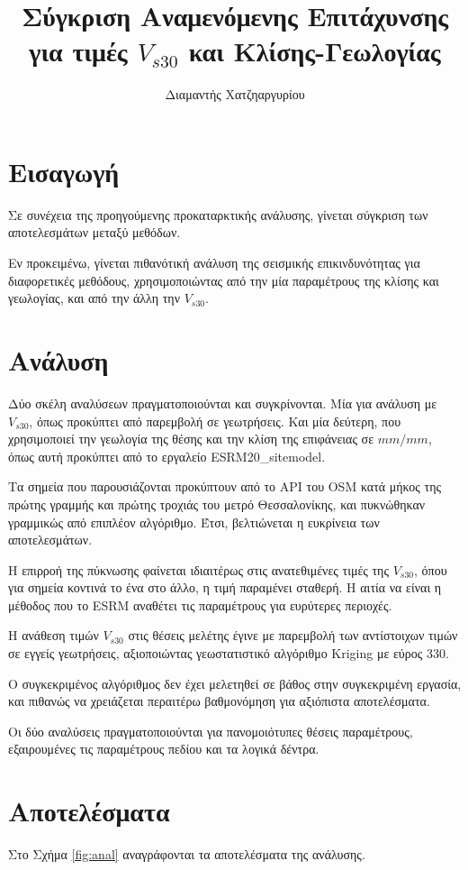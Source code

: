 \documentclass{report}
\title{Σύγκριση Αναμενόμενης Επιτάχυνσης για τιμές $V_{s30}$ και Κλίσης-Γεωλογίας\\
}
\author{Διαμαντής Χατζηαργυρίου}
\date{\Today}
\begin{document}
\maketitle

\section{Εισαγωγή}
Σε συνέχεια της προηγούμενης προκαταρκτικής ανάλυσης, γίνεται σύγκριση των αποτελεσμάτων μεταξύ μεθόδων.

Εν προκειμένω, γίνεται πιθανότική ανάλυση της σεισμικής επικινδυνότητας για διαφορετικές μεθόδους, χρησιμοποιώντας από την μία παραμέτρους της κλίσης και γεωλογίας, και από την άλλη την $V_{s30}$.

\section{Ανάλυση}
Δύο σκέλη αναλύσεων πραγματοποιούνται και συγκρίνονται. Μία για ανάλυση με $V_{s30}$, όπως προκύπτει από παρεμβολή σε γεωτρήσεις. Και μία δεύτερη, που χρησιμοποιεί την γεωλογία της θέσης και την κλίση της επιφάνειας σε $mm/mm$, όπως αυτή προκύπτει από το εργαλείο ESRM20\_sitemodel.

Τα σημεία που παρουσιάζονται προκύπτουν από το API του OSM κατά μήκος της πρώτης γραμμής και πρώτης τροχιάς του μετρό Θεσσαλονίκης, και πυκνώθηκαν γραμμικώς από επιπλέον αλγόριθμο. Έτσι, βελτιώνεται η ευκρίνεια των αποτελεσμάτων.

Η επιρροή της πύκνωσης φαίνεται ιδιαιτέρως στις ανατεθιμένες τιμές της $V_{s30}$, όπου για σημεία κοντινά το ένα στο άλλο, η τιμή παραμένει σταθερή. Η αιτία να είναι η μέθοδος που το ESRM αναθέτει τις παραμέτρους για ευρύτερες περιοχές.

Η ανάθεση τιμών $V_{s30}$ στις θέσεις μελέτης έγινε με παρεμβολή των αντίστοιχων τιμών σε εγγείς γεωτρήσεις, αξιοποιώντας γεωστατιστικό αλγόριθμο Kriging με εύρος 330.

Ο συγκεκριμένος αλγόριθμος δεν έχει μελετηθεί σε βάθος στην συγκεκριμένη εργασία, και πιθανώς να χρειάζεται περαιτέρω βαθμονόμηση για αξιόπιστα αποτελέσματα.

Οι δύο αναλύσεις πραγματοποιούνται για πανομοιότυπες θέσεις παραμέτρους, εξαιρουμένες τις παραμέτρους πεδίου και τα λογικά δέντρα.

\section{Αποτελέσματα}
Στο Σχήμα \ref{fig:anal} αναγράφονται τα αποτελέσματα της ανάλυσης.
\end{document}
